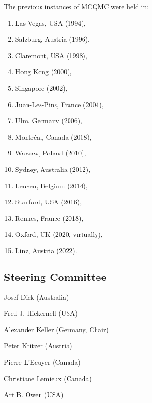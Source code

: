 The previous instances of MCQMC were held in:
\begin{enumerate}
\item Las Vegas, USA (1994),
\item Salzburg, Austria (1996),
\item Claremont, USA (1998),
\item Hong Kong (2000),
\item Singapore (2002),
\item Juan-Les-Pins, France (2004),
\item Ulm, Germany (2006),
\item Montr\'{e}al, Canada (2008),
\item Warsaw, Poland (2010),
\item Sydney, Australia (2012),
\item Leuven, Belgium (2014),
\item Stanford, USA (2016),
\item Rennes, France (2018),
\item Oxford, UK (2020, virtually),
\item Linz, Austria (2022).
\end{enumerate}

\newpage
\subsection{Steering Committee}

\setlength{\columnsep}{1cm}
\begin{multicols}{2}
\raggedright

Josef Dick (Australia)

Fred J. Hickernell (USA)

Alexander Keller (Germany, Chair)

Peter Kritzer (Austria)

Pierre L'Ecuyer (Canada)

Christiane Lemieux (Canada)

Art B. Owen (USA)


\end{multicols}

